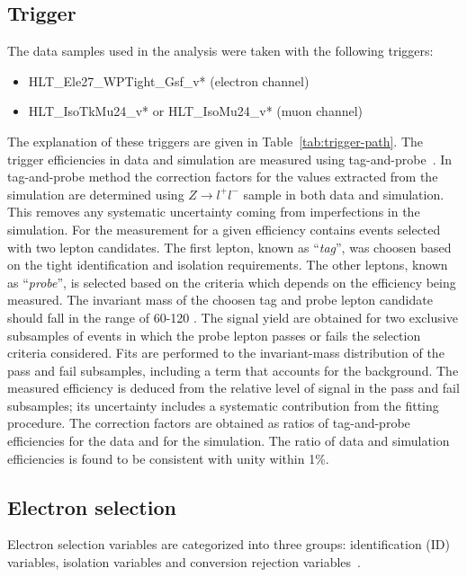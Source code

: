 \subsection{Trigger}
\label{subsec:trigger}
The data samples used in the analysis were taken with the following triggers:
\begin{itemize}
\item HLT\_Ele27\_WPTight\_Gsf\_v* (electron channel)
\item HLT\_IsoTkMu24\_v* or  HLT\_IsoMu24\_v* (muon channel)
\end{itemize}
The explanation of these triggers are given in Table~\ref{tab:trigger-path}. The trigger efficiencies in data and simulation are measured using tag-and-probe~\cite{Tag_probe}. In tag-and-probe method the correction factors  for the values extracted from the simulation are determined using $Z \rightarrow l^+ l^-$ sample in both data and simulation. This removes any systematic uncertainty coming from imperfections in the simulation. For the measurement for a given efficiency contains events selected with two lepton candidates. The first lepton, known as ``\textit{tag}'', was choosen based on the tight identification and isolation requirements. The other leptons, known as ``\textit{probe}'', is selected based on the criteria which depends on the efficiency being measured. The invariant mass of the choosen tag and probe lepton candidate should fall in the range of 60-120 \GeV. The signal yield are obtained for two exclusive subsamples of events in which the probe lepton passes or fails the selection criteria considered. Fits are performed to the invariant-mass distribution of the pass and fail subsamples, including a term that accounts for the background. The measured efficiency is deduced from the relative level of signal in the pass and fail subsamples; its uncertainty includes a systematic contribution from the fitting procedure. The correction factors are obtained as ratios of tag-and-probe efficiencies for the data and for the simulation. The ratio of data and simulation efficiencies is found to be consistent with unity within 1\%.


\subsection{Electron selection}
\label{subsec:electrons}
Electron selection variables are categorized into three groups: identification (ID) variables, isolation variables and conversion rejection variables~\cite{ElectronReconstruction_8TeV_cms,Novakova2013}.

